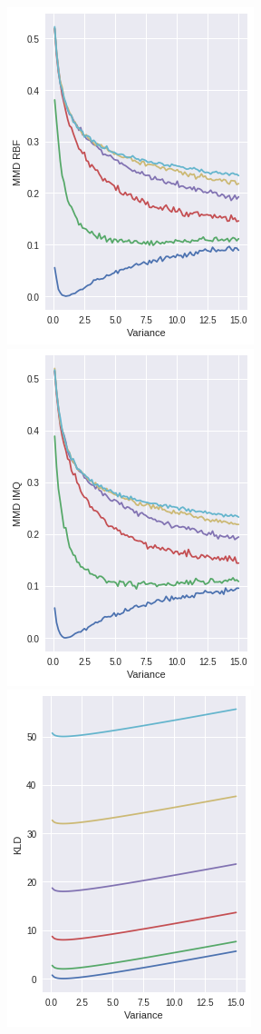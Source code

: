 \documentclass[11pt, english]{article}
\begin{document}
\begin{figure}[H]
   \begin{minipage}[t]{0.05\linewidth}
      \includegraphics[scale=0.55]{img/MMD_RBF_benchmark.png}
   \end{minipage} \hfill
   \begin{minipage}[t]{0.05\linewidth}
      \includegraphics[scale=0.55]{img/MMD_IMQ_benchmark.png}
   \end{minipage} \hfill
   \begin{minipage}[t]{.35\linewidth}
      \includegraphics[scale=0.55]{img/KLD_benchmark.png}

\end{minipage}
\end{figure}
\end{document}
